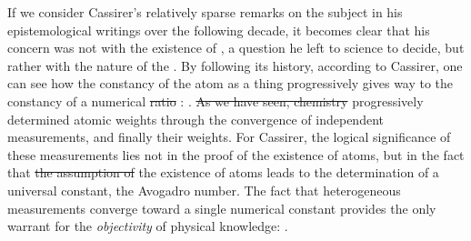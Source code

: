 \documentclass[submitted,12pt]{article}
\providecommand{\DIFadd}[1]{{\protect\color{blue}\uwave{#1}}} %
\providecommand{\DIFdel}[1]{{\protect\color{red}\sout{#1}}}                      %
\providecommand{\DIFaddbegin}{} %
\providecommand{\DIFaddend}{} %
\providecommand{\DIFdelbegin}{} %
\providecommand{\DIFdelend}{} %
\begin{document}
If we consider Cassirer’s relatively sparse remarks on the subject in his epistemological writings over the following decade, it becomes clear that his concern was not with the existence of , a question he left to science to decide, but rather with the nature of the  . By following its history, according to Cassirer, one can see how the constancy of the atom as a thing  progressively gives way to the constancy of a numerical \DIFdelbegin \DIFdel{ratio }\DIFdelend \DIFaddbegin \DIFadd{value }\DIFaddend {}: \DIFdelbegin %
\DIFdelend \DIFaddbegin {} \DIFaddend {}. \DIFdelbegin \DIFdel{As we have seen, chemistry }\DIFdelend \DIFaddbegin \DIFadd{Chemistry }\DIFaddend progressively determined  atomic weights through the convergence of independent measurements, and finally their  weights. For Cassirer, the logical significance of these measurements lies not in the proof of the existence of atoms, but in the fact that \DIFdelbegin \DIFdel{the assumption of }\DIFdelend \DIFaddbegin \DIFadd{assuming }\DIFaddend the existence of atoms leads to the determination of a universal constant, the Avogadro number. The fact that heterogeneous measurements converge toward a single numerical constant provides the only warrant for the \emph{objectivity} of physical knowledge:   .
\end{document}
